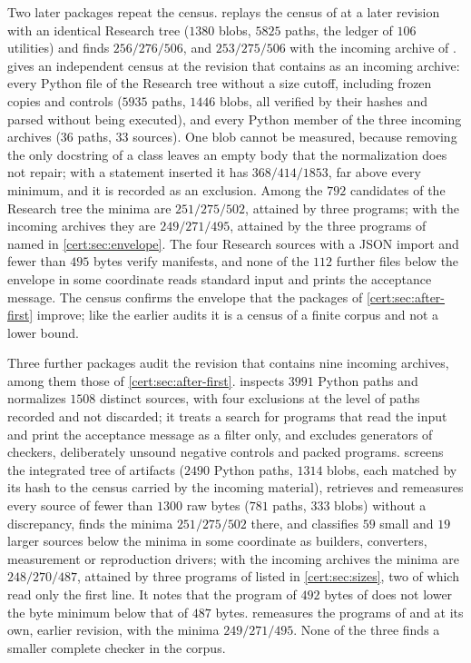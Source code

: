 Two later packages repeat the census.  replays the
census of  at a later revision with an identical Research
tree ($1380$ blobs, $5825$ paths, the ledger of $106$ utilities) and finds
$256/276/506$, and $253/275/506$ with the incoming archive of
.  gives an independent
census at the revision that contains  as an incoming
archive: every Python file of the Research tree without a size cutoff,
including frozen copies and controls ($5935$ paths, $1446$ blobs, all
verified by their hashes and parsed without being executed), and every Python
member of the three incoming archives ($36$ paths, $33$ sources). One blob
cannot be measured, because removing the only docstring of a class leaves an
empty body that the normalization does not repair; with a statement inserted
it has $368/414/1853$, far above every minimum, and it is recorded as an
exclusion. Among the $792$ candidates of the Research tree the minima are
$251/275/502$, attained by three programs; with the incoming archives they
are $249/271/495$, attained by the three programs of 
named in \cref{cert:sec:envelope}. The four Research sources with a JSON
import and fewer than $495$ bytes verify manifests, and none of the $112$
further files below the envelope in some coordinate reads standard input and
prints the acceptance message. The census confirms the envelope that the
packages of \cref{cert:sec:after-first} improve; like the earlier audits it
is a census of a finite corpus and not a lower bound.

Three further packages audit the revision that contains nine incoming
archives, among them those of \cref{cert:sec:after-first}.
 inspects $3991$ Python paths and normalizes
$1508$ distinct sources, with four exclusions at the level of paths recorded
and not discarded; it treats a search for programs that read the input and
print the acceptance message as a filter only, and excludes generators of
checkers, deliberately unsound negative controls and packed programs.
 screens the integrated tree of artifacts ($2490$
Python paths, $1314$ blobs, each matched by its hash to the census carried by
the incoming material), retrieves and remeasures every source of fewer than
$1300$ raw bytes ($781$ paths, $333$ blobs) without a discrepancy, finds the
minima $251/275/502$ there, and classifies $59$ small and $19$ larger sources
below the minima in some coordinate as builders, converters, measurement or
reproduction drivers; with the incoming archives the minima are
$248/270/487$, attained by three programs of  listed in
\cref{cert:sec:sizes}, two of which read only the first line. It notes that
the program of $492$ bytes of  does not lower the
byte minimum below that of $487$ bytes.  remeasures the
programs of  and  at its own, earlier
revision, with the minima $249/271/495$. None of the three finds a smaller
complete checker in the corpus.

